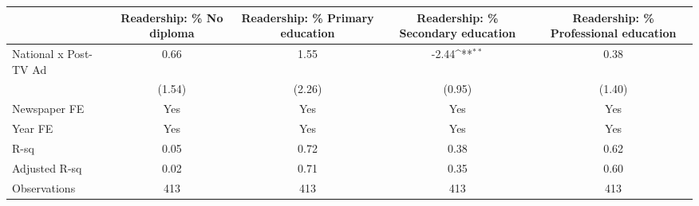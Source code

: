 {
\def\sym#1{\ifmmode^{#1}\else\(^{#1}\)\fi}
\begin{tabular}{l*{4}{c}}
\hline\hline
                    &\multicolumn{1}{c}{Readership: \% No diploma}&\multicolumn{1}{c}{Readership: \% Primary education}&\multicolumn{1}{c}{Readership: \% Secondary education}&\multicolumn{1}{c}{Readership: \% Professional education}\\
\hline
National x Post-TV Ad&        0.66         &        1.55         &       -2.44\sym{**} &        0.38         \\
                    &      (1.54)         &      (2.26)         &      (0.95)         &      (1.40)         \\
\hline
Newspaper FE        &         Yes         &         Yes         &         Yes         &         Yes         \\
Year FE             &         Yes         &         Yes         &         Yes         &         Yes         \\
R-sq                &        0.05         &        0.72         &        0.38         &        0.62         \\
Adjusted R-sq       &        0.02         &        0.71         &        0.35         &        0.60         \\
Observations        &         413         &         413         &         413         &         413         \\
\hline\hline
\end{tabular}
}
